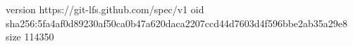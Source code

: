 version https://git-lfs.github.com/spec/v1
oid sha256:5fa4af0d89230af50ca0b47a620daca2207ccd44d7603d4f596bbe2ab35a29e8
size 114350
